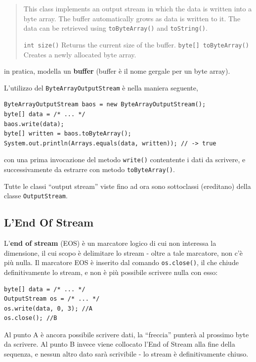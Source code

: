 \documentclass[\fontsizeclass,twocolumn]{\classname}
\theoremstyle{definition}
\theoremstyle{definition}
\begin{document}
\begin{quote}
    \footnotesize{This class implements an output stream in which the data is
    written into a byte array. The buffer automatically grows as data is
written to it. The data can be retrieved using \texttt{toByteArray()} and \texttt{toString()}.}

\texttt{int 	size()} 	Returns the current size of the buffer.
\texttt{byte[] 	toByteArray()} 	Creates a newly allocated byte array.
\end{quote}

in pratica, modella un \textbf{buffer} (buffer è il nome gergale per un byte
array).

L'utilizzo del \texttt{ByteArrayOutputStream} è nella maniera seguente,

\begin{lstlisting}
ByteArrayOutputStream baos = new ByteArrayOutputStream();
byte[] data = /* ... */
baos.write(data);
byte[] written = baos.toByteArray();
System.out.println(Arrays.equals(data, written)); // -> true
\end{lstlisting}

con una prima invocazione del metodo \texttt{write()} contentente i dati da
scrivere, e successivamente da estrarre con metodo \texttt{toByteArray()}.

Tutte le classi ``output stream'' viste fino ad ora sono sottoclassi
(ereditano) della classe \texttt{Output\-Stream}.

\subsection{L'End Of Stream}

L'\textbf{end of stream} (EOS) è un marcatore logico di cui non interessa la
dimensione, il cui scopo è delimitare lo stream \-- oltre a tale marcatore, non
c'è più nulla. Il marcatore EOS è inserito dal comando \texttt{os.close()}, il
che chiude definitivamente lo stream, e non è più possibile scrivere nulla con
esso:

\begin{lstlisting}
byte[] data = /* ... */
OutputStream os = /* ... */
os.write(data, 0, 3); //A
os.close(); //B
\end{lstlisting}

Al punto A è ancora possibile scrivere dati, la ``freccia'' punterà al prossimo
byte da scrivere. Al punto B invece viene collocato l'End of Stream alla fine
della sequenza, e nessun altro dato sarà scrivibile \-- lo stream è
definitivamente chiuso.
\end{document}
